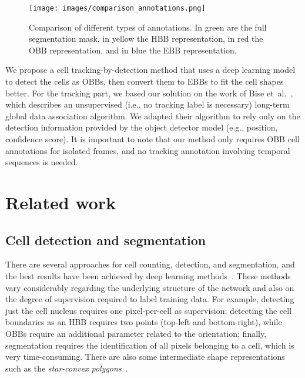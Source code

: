 \documentclass{article}
\begin{document}
\begin{figure}[]
    \centering
    \texttt{[image: images/comparison\_annotations.png]}
    \caption{Comparison of different types of annotations. In green are the full segmentation mask, in yellow the HBB representation, in red the OBB representation, and in blue the EBB representation.}
    \label{fig:comparison_annotations}
\end{figure}

We propose a cell tracking-by-detection method that uses a deep learning model to detect the cells as OBBs, then convert them to EBBs to fit the cell shapes better. For the tracking part, we based our solution on the work of Bise et~al.~\cite{bise}, which describes an unsupervised (i.e., no tracking label is necessary) long-term global data association algorithm. We adapted their algorithm to rely only on the detection information provided by the object detector model (e.g., position, confidence score). It is important to note that our method only requires OBB cell annotations for isolated frames, and no tracking annotation involving temporal sequences is needed. 

\section{Related work}

\subsection{Cell detection and segmentation}
There are several approaches for cell counting, detection, and segmentation, and the best results have been achieved by deep learning methods~\cite{xing2017deep,moen2019deep}. 
These methods vary considerably regarding the underlying structure of the network and also on the degree of supervision required to label training data. For example, detecting just the cell nucleus requires one pixel-per-cell as supervision; detecting the cell boundaries as an HBB requires two points (top-left and bottom-right), while OBBs require an additional parameter related to the orientation; finally, segmentation requires the identification of all pixels belonging to a cell, which is very time-consuming. There are also some intermediate shape representations such as the \textit{star-convex polygons}~\cite{schmidt2018cell}.
\end{document}
